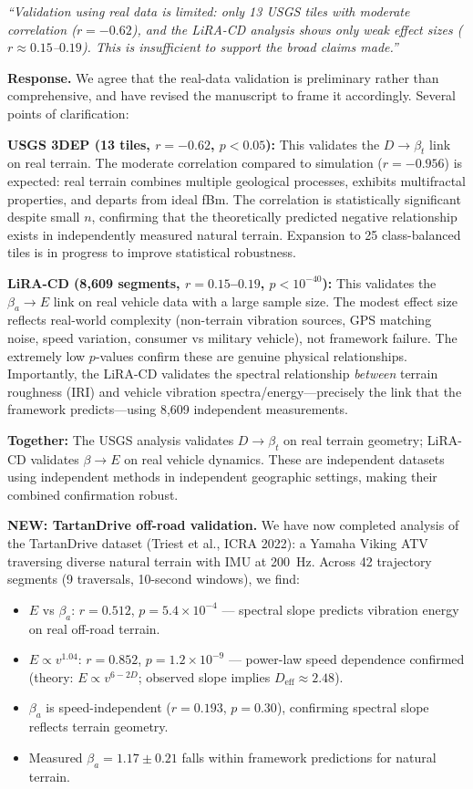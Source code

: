 \documentclass[11pt]{article}
\newcommand{\revquote}[1]{\medskip\noindent\textit{``#1''}\medskip}
\begin{document}
\revquote{Validation using real data is limited: only 13 USGS tiles with moderate correlation ($r = -0.62$), and the LiRA-CD analysis shows only weak effect sizes ($r \approx 0.15$--$0.19$). This is insufficient to support the broad claims made.}

\noindent\textbf{Response.} We agree that the real-data validation is preliminary rather than comprehensive, and have revised the manuscript to frame it accordingly. Several points of clarification:

\textbf{USGS 3DEP (13 tiles, $r = -0.62$, $p < 0.05$):} This validates the $D \rightarrow \beta_t$ link on real terrain. The moderate correlation compared to simulation ($r = -0.956$) is expected: real terrain combines multiple geological processes, exhibits multifractal properties, and departs from ideal fBm. The correlation is statistically significant despite small $n$, confirming that the theoretically predicted negative relationship exists in independently measured natural terrain. Expansion to 25 class-balanced tiles is in progress to improve statistical robustness.

\textbf{LiRA-CD (8,609 segments, $r = 0.15$--$0.19$, $p < 10^{-40}$):} This validates the $\beta_a \rightarrow E$ link on real vehicle data with a large sample size. The modest effect size reflects real-world complexity (non-terrain vibration sources, GPS matching noise, speed variation, consumer vs military vehicle), not framework failure. The extremely low $p$-values confirm these are genuine physical relationships. Importantly, the LiRA-CD validates the spectral relationship \emph{between} terrain roughness (IRI) and vehicle vibration spectra/energy---precisely the link that the framework predicts---using 8,609 independent measurements.

\textbf{Together:} The USGS analysis validates $D \rightarrow \beta_t$ on real terrain geometry; LiRA-CD validates $\beta \rightarrow E$ on real vehicle dynamics. These are independent datasets using independent methods in independent geographic settings, making their combined confirmation robust.

\textbf{NEW: TartanDrive off-road validation.} We have now completed analysis of the TartanDrive dataset (Triest et al., ICRA 2022): a Yamaha Viking ATV traversing diverse natural terrain with IMU at 200~Hz. Across 42 trajectory segments (9 traversals, 10-second windows), we find:

\begin{itemize}[leftmargin=*]
\item $E$ vs $\beta_a$: $r = 0.512$, $p = 5.4 \times 10^{-4}$ --- spectral slope predicts vibration energy on real off-road terrain.
\item $E \propto v^{1.04}$: $r = 0.852$, $p = 1.2 \times 10^{-9}$ --- power-law speed dependence confirmed (theory: $E \propto v^{6-2D}$; observed slope implies $D_{\mathrm{eff}} \approx 2.48$).
\item $\beta_a$ is speed-independent ($r = 0.193$, $p = 0.30$), confirming spectral slope reflects terrain geometry.
\item Measured $\beta_a = 1.17 \pm 0.21$ falls within framework predictions for natural terrain.
\end{itemize}
\end{document}
